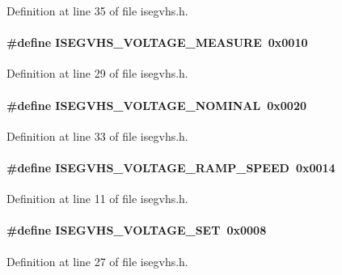 Definition at line 35 of file isegvhs.h.
\paragraph[{ISEGVHS\_\-VOLTAGE\_\-MEASURE}]{\setlength{\rightskip}{0pt plus 5cm}\#define ISEGVHS\_\-VOLTAGE\_\-MEASURE~0x0010}\hfill\label{isegvhs_8h_af87f1e13285f77aa64881ee9abfd4b21}


Definition at line 29 of file isegvhs.h.
\paragraph[{ISEGVHS\_\-VOLTAGE\_\-NOMINAL}]{\setlength{\rightskip}{0pt plus 5cm}\#define ISEGVHS\_\-VOLTAGE\_\-NOMINAL~0x0020}\hfill\label{isegvhs_8h_ac6378c9e755b0544023a54ed23a054f8}


Definition at line 33 of file isegvhs.h.
\paragraph[{ISEGVHS\_\-VOLTAGE\_\-RAMP\_\-SPEED}]{\setlength{\rightskip}{0pt plus 5cm}\#define ISEGVHS\_\-VOLTAGE\_\-RAMP\_\-SPEED~0x0014}\hfill\label{isegvhs_8h_ab74ac74fd489930d22cad802e3c0ed33}


Definition at line 11 of file isegvhs.h.
\paragraph[{ISEGVHS\_\-VOLTAGE\_\-SET}]{\setlength{\rightskip}{0pt plus 5cm}\#define ISEGVHS\_\-VOLTAGE\_\-SET~0x0008}\hfill\label{isegvhs_8h_a6ccc94c97057e17ccd9c22df3303ded8}


Definition at line 27 of file isegvhs.h.